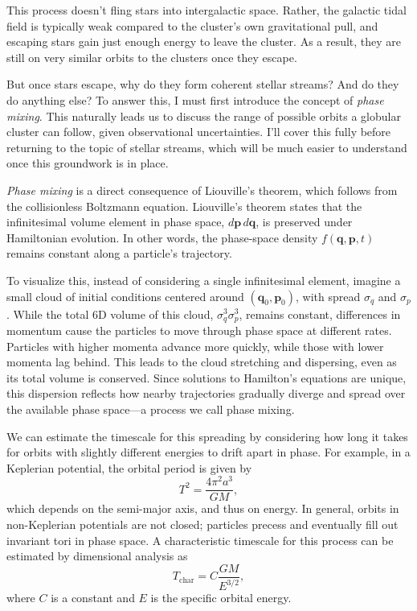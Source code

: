         This process doesn't fling stars into intergalactic space. Rather, the galactic tidal field is typically weak compared to the cluster's own gravitational pull, and escaping stars gain just enough energy to leave the cluster. As a result, they are still on very similar orbits to the clusters once they escape.

        But once stars escape, why do they form coherent stellar streams? And do they do anything else? To answer this, I must first introduce the concept of \textit{phase mixing}. This naturally leads us to discuss the range of possible orbits a globular cluster can follow, given observational uncertainties. I'll cover this fully before returning to the topic of stellar streams, which will be much easier to understand once this groundwork is in place.
        
        \textit{Phase mixing} is a direct consequence of Liouville's theorem, which follows from the collisionless Boltzmann equation. Liouville's theorem states that the infinitesimal volume element in phase space, \( d\mathbf{p}\,d\mathbf{q} \), is preserved under Hamiltonian evolution. In other words, the phase-space density \( f(\mathbf{q}, \mathbf{p}, t) \) remains constant along a particle's trajectory.

        To visualize this, instead of considering a single infinitesimal element, imagine a small cloud of initial conditions centered around \((\mathbf{q}_0, \mathbf{p}_0)\), with spread \(\sigma_q\) and \(\sigma_p\). While the total 6D volume of this cloud, \(\sigma_q^3 \sigma_p^3\), remains constant, differences in momentum cause the particles to move through phase space at different rates. Particles with higher momenta advance more quickly, while those with lower momenta lag behind. This leads to the cloud stretching and dispersing, even as its total volume is conserved. Since solutions to Hamilton's equations are unique, this dispersion reflects how nearby trajectories gradually diverge and spread over the available phase space—a process we call phase mixing.

        We can estimate the timescale for this spreading by considering how long it takes for orbits with slightly different energies to drift apart in phase. For example, in a Keplerian potential, the orbital period is given by
        \begin{equation}
            T^2 = \frac{4\pi^2 a^3}{GM},
        \end{equation}
        which depends on the semi-major axis, and thus on energy. In general, orbits in non-Keplerian potentials are not closed; particles precess and eventually fill out invariant tori in phase space. A characteristic timescale for this process can be estimated by dimensional analysis as
        \begin{equation}
            T_\mathrm{char} = C \frac{GM}{E^{3/2}},
        \end{equation}
        where \(C\) is a constant and \(E\) is the specific orbital energy.


